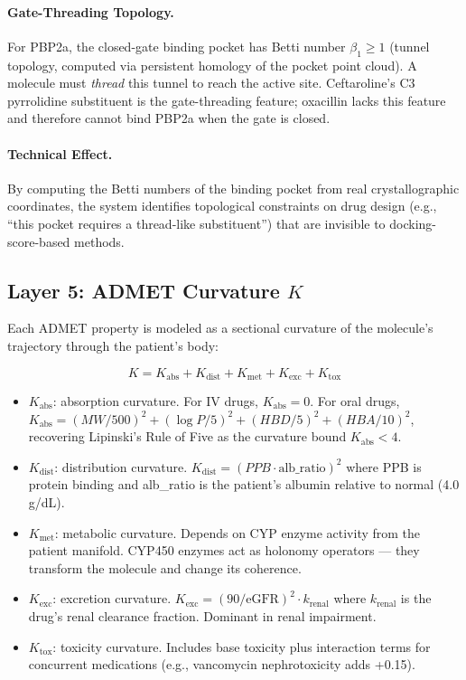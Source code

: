\documentclass[11pt]{article}
\begin{document}
\paragraph{Gate-Threading Topology.}
For PBP2a, the closed-gate binding pocket has Betti number $\beta_1 \geq 1$ (tunnel
topology, computed via persistent homology of the pocket point cloud). A molecule must
\emph{thread} this tunnel to reach the active site. Ceftaroline's C3 pyrrolidine substituent
is the gate-threading feature; oxacillin lacks this feature and therefore cannot bind PBP2a
when the gate is closed.

\paragraph{Technical Effect.}
By computing the Betti numbers of the binding pocket from real crystallographic coordinates,
the system identifies topological constraints on drug design (e.g., ``this pocket requires a
thread-like substituent'') that are invisible to docking-score-based methods.

\subsection{Layer 5: ADMET Curvature $K$}

Each ADMET property is modeled as a sectional curvature of the molecule's trajectory through
the patient's body:

\begin{equation}\label{eq:K}
K = K_{\text{abs}} + K_{\text{dist}} + K_{\text{met}} + K_{\text{exc}} + K_{\text{tox}}
\end{equation}

\begin{itemize}[leftmargin=*]
    \item $K_{\text{abs}}$: absorption curvature. For IV drugs, $K_{\text{abs}} = 0$. For
    oral drugs, $K_{\text{abs}} = (MW/500)^2 + (\log P/5)^2 + (HBD/5)^2 + (HBA/10)^2$,
    recovering Lipinski's Rule of Five as the curvature bound $K_{\text{abs}} < 4$.
    \item $K_{\text{dist}}$: distribution curvature. $K_{\text{dist}} = (PPB \cdot
    \text{alb\_ratio})^2$ where PPB is protein binding and alb\_ratio is the patient's
    albumin relative to normal (4.0\,g/dL).
    \item $K_{\text{met}}$: metabolic curvature. Depends on CYP enzyme activity from the
    patient manifold. CYP450 enzymes act as holonomy operators — they transform the molecule
    and change its coherence.
    \item $K_{\text{exc}}$: excretion curvature. $K_{\text{exc}} = (90/\text{eGFR})^2
    \cdot k_{\text{renal}}$ where $k_{\text{renal}}$ is the drug's renal clearance fraction.
    Dominant in renal impairment.
    \item $K_{\text{tox}}$: toxicity curvature. Includes base toxicity plus interaction terms
    for concurrent medications (e.g., vancomycin nephrotoxicity adds +0.15).
\end{itemize}
\end{document}
